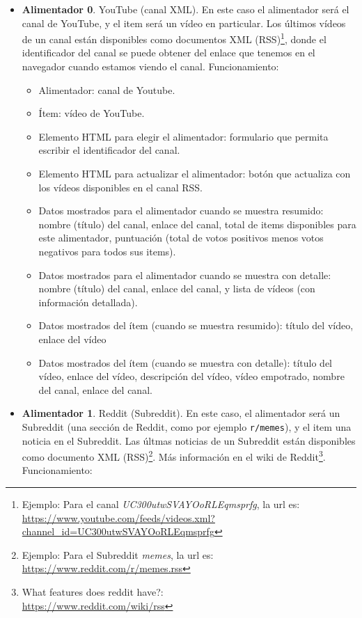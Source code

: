 \begin{itemize}
\item \textbf{Alimentador 0}. YouTube (canal XML). En este caso el alimentador será el canal de YouTube, y el item será un vídeo en particular. Los últimos vídeos de un canal están disponibles como documentos XML (RSS)\footnote{Ejemplo: Para el canal \emph{UC300utwSVAYOoRLEqmsprfg}, la url es:\\ \url{https://www.youtube.com/feeds/videos.xml?channel_id=UC300utwSVAYOoRLEqmsprfg}}, donde el identificador del canal se puede obtener del enlace que tenemos en el navegador cuando estamos viendo el canal. Funcionamiento:
  
  \begin{itemize}
  \item Alimentador: canal de Youtube.
  \item Ítem: vídeo de YouTube.
  \item Elemento HTML para elegir el alimentador: formulario que permita escribir el identificador del canal.
  \item Elemento HTML para actualizar el alimentador: botón que actualiza con los vídeos disponibles en el canal RSS.
  \item Datos mostrados para el alimentador cuando se muestra resumido: nombre (título) del canal, enlace del canal, total de items disponibles para este alimentador, puntuación (total de votos positivos menos votos negativos para todos sus items).
  \item Datos mostrados para el alimentador cuando se muestra con detalle: nombre (título) del canal, enlace del canal, y lista de vídeos (con información detallada).
  \item Datos mostrados del ítem (cuando se muestra resumido): título del vídeo, enlace del vídeo
  \item Datos mostrados del ítem (cuando se muestra con detalle): título del vídeo, enlace del vídeo, descripción del vídeo, vídeo empotrado, nombre del canal, enlace del canal.
  \end{itemize}

\item \textbf{Alimentador 1}. Reddit (Subreddit). En este caso, el alimentador será un Subreddit (una sección de Reddit, como por ejemplo \verb|r/memes|), y el item una noticia en el Subreddit. Las últmas noticias de un Subreddit están disponibles como documento XML (RSS)\footnote{Ejemplo: Para el Subreddit \emph{memes}, la url es:\\ \url{https://www.reddit.com/r/memes.rss}}. Más información en el wiki de Reddit\footnote{What features does reddit have?: \\ \url{https://www.reddit.com/wiki/rss}}. Funcionamiento:


\end{itemize}
